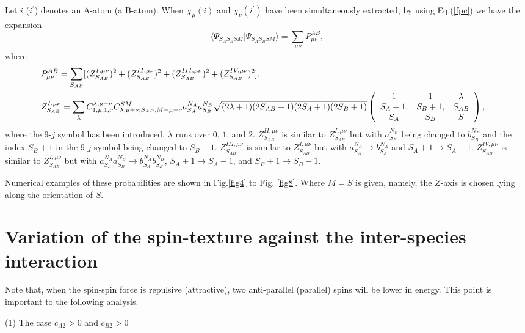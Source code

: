 \documentclass[10pt]{wlscirep}
\begin{document}
Let $i$ ($i^{\prime }$) denotes an A-atom (a B-atom). When $\chi_{\mu }(i)$
and $\chi_{\nu}(i^{\prime })$ have been simultaneously extracted, by using
Eq.(\ref{fpc}) we have the expansion
\begin{equation}
\langle\Psi_{S_AS_BSM}|\Psi_{S_AS_BSM}\rangle = \sum_{\mu\nu} P_{\mu \nu
}^{AB},
\end{equation}
where
\begin{eqnarray}
& P_{\mu\nu}^{AB} = \sum_{S_{AB}} [ (Z_{S_{AB}}^{I,\mu\nu})^2
+(Z_{S_{AB}}^{II,\mu\nu})^2 +(Z_{S_{AB}}^{III,\mu\nu})^2
+(Z_{S_{AB}}^{IV,\mu\nu})^2 ],& \\
& Z_{S_{AB}}^{I,\mu\nu} = \sum_{\lambda} C_{1,\mu;1,\nu}^{\lambda,\mu+\nu}
C_{\lambda,\mu+\nu;S_{AB},M-\mu-\nu}^{SM} a_{S_A}^{N_A} a_{S_B}^{N_B} \sqrt{%
(2\lambda+1)(2S_{AB}+1)(2S_A+1)(2S_B+1)} \left(
\begin{array}{ccc}
1 & 1 & \lambda \\
S_A+1, & S_B+1, & S_{AB} \\
S_A & S_B & S%
\end{array}
\right), &
\end{eqnarray}
where the 9-$j$ symbol has been introduced, $\lambda$ runs over $0$, $1$,
and $2$. $Z_{S_{AB}}^{II,\mu\nu}$ is similar to $Z_{S_{AB}}^{I,\mu\nu}$ but
with $a_{S_B}^{N_B}$ being changed to $b_{S_B}^{N_B}$ and the index $S_B+1$
in the 9-$j$ symbol being changed to $S_B-1$. $Z_{S_{AB}}^{III,\mu\nu}$ is
similar to $Z_{S_{AB}}^{I,\mu\nu}$ but with $a_{S_A}^{N_A}\rightarrow
b_{S_A}^{N_A}$ and $S_A+1\rightarrow S_A-1$. $Z_{S_{AB}}^{IV,\mu\nu}$ is
similar to $Z_{S_{AB}}^{I,\mu\nu}$ but with $a_{S_A}^{N_A}a_{S_B}^{N_B}%
\rightarrow b_{S_A}^{N_A}b_{S_B}^{N_B}$, $S_A+1\rightarrow S_A-1$, and $%
S_B+1\rightarrow S_B-1$.

Numerical examples of these probabilities are shown in Fig.\ref{fig4} to Fig.%
\ref{fig8}. Where $M=S$ is given, namely, the $Z$-axis is chosen lying along
the orientation of $S$.



\section*{Variation of the spin-texture against the inter-species interaction%
}

Note that, when the spin-spin force is repulsive (attractive), two
anti-parallel (parallel) spins will be lower in energy. This point is
important to the following analysis.

(1) The case $c_{A2}>0$ and $c_{B2}>0$
\end{document}
